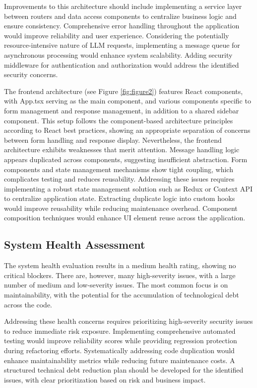\documentclass[sigconf]{acmart}
\begin{document}
Improvements to this architecture should include implementing a service layer between routers and data access components to centralize business logic and ensure consistency. Comprehensive error handling throughout the application would improve reliability and user experience. Considering the potentially resource-intensive nature of LLM requests, implementing a message queue for asynchronous processing would enhance system scalability. Adding security middleware for authentication and authorization would address the identified security concerns.

The frontend architecture (see Figure \ref{fig:figure2}) features React components, with App.tsx serving as the main component, and various components specific to form management and response management, in addition to a shared sidebar component. This setup follows the component-based architecture principles according to React best practices, showing an appropriate separation of concerns between form handling and response display. Nevertheless, the frontend architecture exhibits weaknesses that merit attention. Message handling logic appears duplicated across components, suggesting insufficient abstraction. Form components and state management mechanisms show tight coupling, which complicates testing and reduces reusability. Addressing these issues requires implementing a robust state management solution such as Redux or Context API to centralize application state. Extracting duplicate logic into custom hooks would improve reusability while reducing maintenance overhead. Component composition techniques would enhance UI element reuse across the application.

\subsection{System Health Assessment}
The system health evaluation results in a medium health rating, showing no critical blockers. There are, however, many high-severity issues, with a large number of medium and low-severity issues. The most common focus is on maintainability, with the potential for the accumulation of technological debt across the code.

Addressing these health concerns requires prioritizing high-severity security issues to reduce immediate risk exposure. Implementing comprehensive automated testing would improve reliability scores while providing regression protection during refactoring efforts. Systematically addressing code duplication would enhance maintainability metrics while reducing future maintenance costs. A structured technical debt reduction plan should be developed for the identified issues, with clear prioritization based on risk and business impact.
\end{document}
